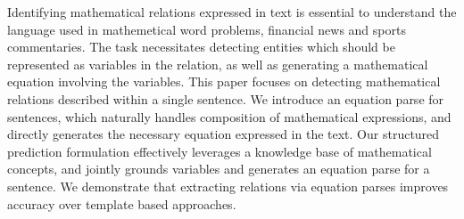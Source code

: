   Identifying mathematical relations expressed in text is essential to
  understand the language used in mathemetical word problems,
  financial news and sports commentaries. The task necessitates
  detecting entities which should be represented as variables in
  the relation, as well as generating a mathematical equation
  involving the variables. This paper focuses on detecting
  mathematical relations described within a single sentence. We
  introduce an equation parse for sentences, which naturally handles
  composition of mathematical expressions, and directly generates the
  necessary equation expressed in the text. Our structured prediction
  formulation effectively leverages a knowledge base of mathematical
  concepts, and jointly grounds variables and generates an equation
  parse for a sentence. We demonstrate that extracting relations via
  equation parses improves accuracy over template based approaches.
